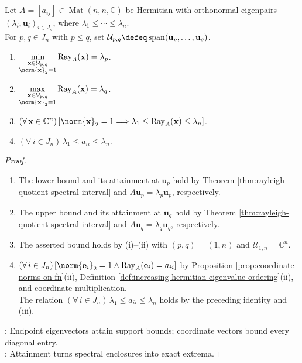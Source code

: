 \begin{corollary} \label{cor:rayleigh-extrema-and-diagonal-entry-bounds} \\
Let $A=[a_{ij}]\in\operatorname{Mat}(n,n,\mathbb{C})$ be Hermitian with orthonormal eigenpairs $(\lambda_i,\mathbf{u}_i)_{i\in J_n}$, where $\lambda_1\leq\cdots\leq\lambda_n$.\\
For $p,q\in J_n$ with $p\leq q$, set $\mathcal{U}_{p,q}\defeq\operatorname{span}(\mathbf{u}_p,\ldots,\mathbf{u}_q)$.
\begin{enumerate}[label=(\roman*)]
\setlength{\itemsep}{0pt}
\item $\min\limits_{\substack{\mathbf{x}\in\mathcal{U}_{p,q}\\ \norm{\mathbf{x}}_2=1}}\operatorname{Ray}_A(\mathbf{x})=\lambda_p$.
\item $\max\limits_{\substack{\mathbf{x}\in\mathcal{U}_{p,q}\\ \norm{\mathbf{x}}_2=1}}\operatorname{Ray}_A(\mathbf{x})=\lambda_q$.
\item $(\forall\,\mathbf{x}\in\mathbb{C}^n)\,[\norm{\mathbf{x}}_2=1\Longrightarrow\lambda_1\leq\operatorname{Ray}_A(\mathbf{x})\leq\lambda_n]$.
\item $(\forall\,i\in J_n)\,\lambda_1\leq a_{ii}\leq\lambda_n$.
\end{enumerate}
\begin{proof}
\begin{enumerate}[label=(\roman*)]
\setlength{\itemsep}{0pt}
\item The lower bound and its attainment at $\mathbf{u}_p$ hold by Theorem \ref{thm:rayleigh-quotient-spectral-interval} and $A\mathbf{u}_p=\lambda_p\mathbf{u}_p$, respectively.
\item The upper bound and its attainment at $\mathbf{u}_q$ hold by Theorem \ref{thm:rayleigh-quotient-spectral-interval} and $A\mathbf{u}_q=\lambda_q\mathbf{u}_q$, respectively.
\item The asserted bound holds by (i)--(ii) with $(p,q)=(1,n)$ and $\mathcal{U}_{1,n}=\mathbb{C}^n$.
\item $(\forall\,i\in J_n)\,[\norm{\mathbf{e}_i}_2=1\land\operatorname{Ray}_A(\mathbf{e}_i)=a_{ii}]$ by Proposition \ref{prop:coordinate-norms-on-fn}(ii), Definition \ref{def:increasing-hermitian-eigenvalue-ordering}(ii), and coordinate multiplication.\\
The relation $(\forall\,i\in J_n)\,\lambda_1\leq a_{ii}\leq\lambda_n$ holds by the preceding identity and (iii).
\end{enumerate}
: Endpoint eigenvectors attain support bounds; coordinate vectors bound every diagonal entry.\\
: Attainment turns spectral enclosures into exact extrema.
\end{proof}
\end{corollary}

